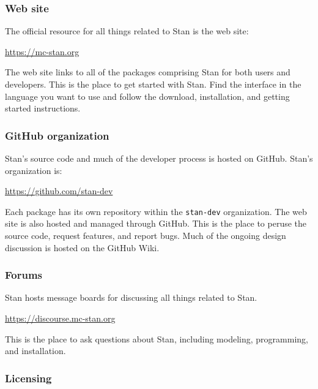 \documentclass[
  10pt,
]{book}
\begin{document}
\hypertarget{web-site}{%
\subsubsection*{Web site}\label{web-site}}

The official resource for all things related to Stan is the web site:

\url{https://mc-stan.org}

The web site links to all of the packages comprising Stan for both
users and developers. This is the place to get started with Stan.
Find the interface in the language you want to use and follow the
download, installation, and getting started instructions.

\hypertarget{github-organization}{%
\subsubsection*{GitHub organization}\label{github-organization}}

Stan's source code and much of the developer process is hosted on
GitHub. Stan's organization is:

\url{https://github.com/stan-dev}

Each package has its own repository within the \texttt{stan-dev}
organization. The web site is also hosted and managed through GitHub.
This is the place to peruse the source code, request features, and
report bugs. Much of the ongoing design discussion is hosted on the
GitHub Wiki.

\hypertarget{forums}{%
\subsubsection*{Forums}\label{forums}}

Stan hosts message boards for discussing all things
related to Stan.

\url{https://discourse.mc-stan.org}

This is the place to ask questions about Stan, including modeling,
programming, and installation.

\hypertarget{licensing}{%
\subsubsection*{Licensing}\label{licensing}}
\end{document}
